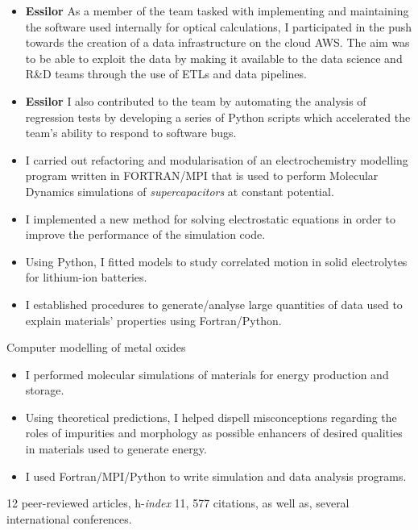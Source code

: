 \documentclass[10pt,a4paper,ragged2e,academicons]{altacv}
\begin{document}
\divider

\begin{itemize}
\item \textbf{Essilor} As a member of the team tasked with implementing and maintaining the software used internally for optical calculations, I participated in the push towards the creation of a data infrastructure on the cloud AWS. The aim was to be able to exploit the data by making it available to the data science and R\&D teams through the use of ETLs and data pipelines. 
\item \textbf{Essilor} I also contributed to the team by automating the analysis of regression tests by developing a series of Python scripts which accelerated the team's ability to respond to software bugs.
\end{itemize}

\divider

\begin{itemize}
\item I carried out refactoring and modularisation of an electrochemistry modelling program written in FORTRAN/MPI that is used to perform Molecular Dynamics simulations of \textit{supercapacitors} at constant potential.
\item I implemented a new method for solving electrostatic equations in order to improve the performance of the simulation code.  
\end{itemize}

\clearpage
{}

\begin{itemize}
\item Using Python, I fitted models to study correlated motion in
solid electrolytes for lithium-ion batteries.
\item I established procedures to generate/analyse large
quantities of data used to explain materials'
properties using Fortran/Python. 
\end{itemize}

\divider

Computer modelling of metal oxides
\smallskip
\begin{itemize}
\item I performed molecular simulations of materials for energy production and storage.
\item Using theoretical predictions, I helped dispell
misconceptions regarding the roles of impurities
and morphology as possible enhancers of
desired qualities in materials used to generate
energy.
\item I used Fortran/MPI/Python to write simulation and data analysis programs.
\end{itemize}
{\small 12 peer-reviewed articles, h-\textit{index} 11, 577 citations, as well as, several international conferences.}
\end{document}
